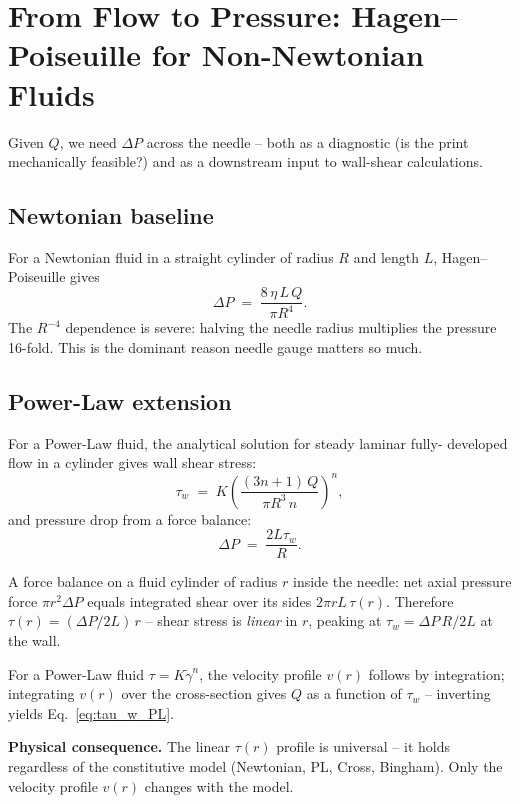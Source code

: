 \documentclass[11pt,a4paper]{article}
\newcommand{\gd}{\dot{\gamma}}
\begin{document}
\section{From Flow to Pressure: Hagen--Poiseuille for Non-Newtonian Fluids}
\label{sec:HP}

Given $Q$, we need $\Delta P$ across the needle -- both as a diagnostic
(is the print mechanically feasible?) and as a downstream input to
wall-shear calculations.

\subsection{Newtonian baseline}

For a Newtonian fluid in a straight cylinder of radius $R$ and length
$L$, Hagen--Poiseuille gives
\begin{equation}
\Delta P \;=\; \frac{8\,\eta\,L\,Q}{\pi R^4}.
\label{eq:HP_newton}
\end{equation}
The $R^{-4}$ dependence is severe: halving the needle radius multiplies
the pressure 16-fold. This is the dominant reason needle gauge matters
so much.

\subsection{Power-Law extension}

For a Power-Law fluid, the analytical solution for steady laminar fully-
developed flow in a cylinder gives wall shear stress:
\begin{equation}
\tau_w \;=\; K\!\left(\frac{(3n+1)\,Q}{\pi R^3\, n}\right)^{\!n},
\label{eq:tau_w_PL}
\end{equation}
and pressure drop from a force balance:
\begin{equation}
\Delta P \;=\; \frac{2 L \tau_w}{R}.
\label{eq:HP_PL}
\end{equation}

\begin{derivationbox}
A force balance on a fluid cylinder of radius $r$ inside the needle:
net axial pressure force $\pi r^2\Delta P$ equals integrated shear over
its sides $2\pi r L\,\tau(r)$. Therefore $\tau(r)=(\Delta P/2L)\,r$ --
shear stress is \emph{linear} in $r$, peaking at
$\tau_w=\Delta P\,R/2L$ at the wall.

For a Power-Law fluid $\tau=K\gd^n$, the velocity profile $v(r)$
follows by integration; integrating $v(r)$ over the cross-section gives
$Q$ as a function of $\tau_w$ -- inverting yields Eq.~\ref{eq:tau_w_PL}.

\textbf{Physical consequence.} The linear $\tau(r)$ profile is universal
-- it holds regardless of the constitutive model (Newtonian, PL, Cross,
Bingham). Only the velocity profile $v(r)$ changes with the model.
\end{derivationbox}
\end{document}
